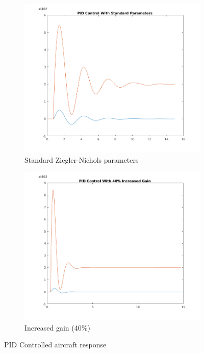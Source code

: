 \documentclass{article}
\begin{document}
\begin{figure}[htp]
\centering
\begin{subfigure}{.5\textwidth}
  \centering
  \includegraphics[width=0.9\linewidth]{PID_control_std.png}
	\caption{Standard Ziegler-Nichols parameters}
	\label{fig:pid_std}
\end{subfigure}%
\begin{subfigure}{.5\textwidth}
  \centering
  \includegraphics[width=0.9\linewidth]{PID_control_40percent.png}
  \caption{Increased gain (40\%)}
  \label{fig:cw_25}
\end{subfigure}
\caption{PID Controlled aircraft response}
\end{figure}
\end{document}
